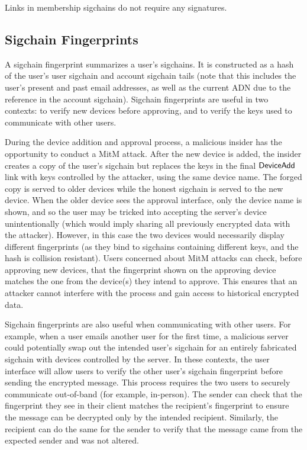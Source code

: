 Links in membership sigchains do not require any signatures.

\subsection{Sigchain Fingerprints}
\label{subsec:fingerprints}
A sigchain fingerprint summarizes a user's sigchains. It is constructed as a hash of the user's user
sigchain and account sigchain tails (note that this includes the user's present and past email
addresses, as well as the current ADN due to the reference in the account sigchain). Sigchain
fingerprints are useful in two contexts: to verify new devices before approving, and to verify the
keys used to communicate with other users.

During the device addition and approval process, a malicious insider has the opportunity to conduct
a MitM attack. After the new device is added, the insider creates a copy of the
user's sigchain but replaces the keys in the final $\mathsf{DeviceAdd}{}$ link with keys controlled by the
attacker, using the same device name. The forged copy is served to older devices while the honest
sigchain is served to the new device. When the older device sees the approval interface, only the
device name is shown, and so the user may be tricked into accepting the server's device
unintentionally (which would imply sharing all previously encrypted data with the attacker).
However, in this case the two devices would necessarily display different fingerprints (as they bind
to sigchains containing different keys, and the hash is collision resistant). Users concerned about
MitM attacks can check, before approving new devices, that the fingerprint shown on
the approving device matches the one from the device(s) they intend to approve. This ensures that an
attacker cannot interfere with the process and gain access to historical encrypted data.

Sigchain fingerprints are also useful when communicating with other users. For example, when a user
emails another user for the first time, a malicious server could potentially swap out the intended
user's sigchain for an entirely fabricated sigchain with devices controlled by the server. In these
contexts, the user interface will allow users to verify the other user's sigchain fingerprint before
sending the encrypted message. This process requires the two users to securely communicate
out-of-band (for example, in-person). The sender can check that the fingerprint they see in their
client matches the recipient's fingerprint to ensure the message can be decrypted only by the
intended recipient. Similarly, the recipient can do the same for the sender to verify that the
message came from the expected sender and was not altered.

